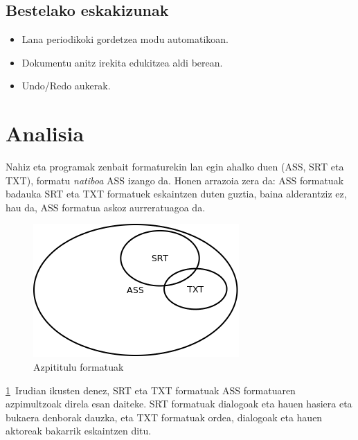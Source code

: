 \subsection{Bestelako eskakizunak}
\begin{itemize}
\item Lana periodikoki gordetzea modu automatikoan.
\item Dokumentu anitz irekita edukitzea aldi berean.
\item Undo/Redo aukerak.
\end{itemize}

\section{Analisia}
Nahiz eta programak zenbait formaturekin lan egin ahalko duen (ASS, SRT eta TXT), formatu \textit{natiboa} ASS izango da. Honen arrazoia zera da: ASS formatuak badauka SRT eta TXT formatuek eskaintzen duten guztia, baina alderantziz ez, hau da, ASS formatua askoz aurreratuagoa da. 

\begin{figure}[htp]
\begin{center}
\includegraphics[scale=0.5]{Pictures/Chapter4/Analisia/formatuak.png}
\caption{Azpititulu formatuak}
\label{formatuak}
\end{center}
\end{figure}

\ref{formatuak}~Irudian ikusten denez, SRT eta TXT formatuak ASS formatuaren azpimultzoak direla esan daiteke. SRT formatuak dialogoak eta hauen hasiera eta bukaera denborak dauzka, eta TXT formatuak ordea, dialogoak eta hauen aktoreak bakarrik eskaintzen ditu.
